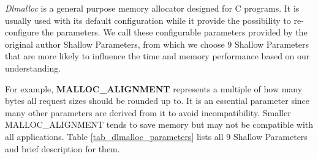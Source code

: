 
\emph{Dlmalloc} is a general purpose memory allocator designed for C programs. It is usually used with its default configuration while it provide the possibility to re-configure the parameters. We call these configurable parameters provided by the original author Shallow Parameters, from which we choose 9 Shallow Parameters that are more likely to influence the time and memory performance based on our understanding.

For example, \textbf{MALLOC\_ALIGNMENT} represents a multiple of how many bytes all request sizes should be rounded up to. It is an essential parameter since many other parameters are derived from it to avoid incompatibility. Smaller MALLOC\_ALIGNMENT tends to save memory but may not be compatible with all applications. Table \ref{tab_dlmalloc_parameters} lists all 9 Shallow Parameters and brief description for them.


